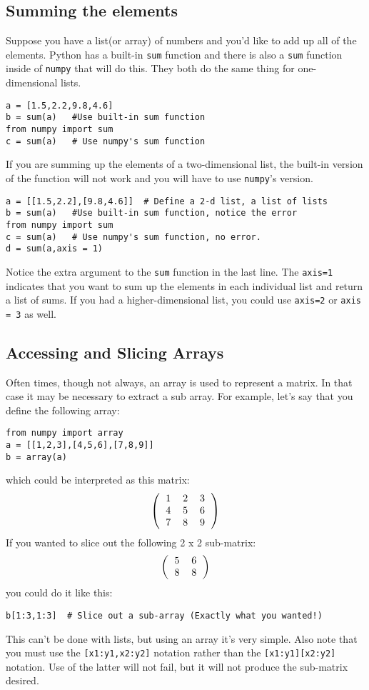 \subsection*{Summing the elements}
Suppose you have a list(or array) of numbers and you'd like to add up
all of the elements.  Python has a built-in \texttt{sum} function and
there is also a \texttt{sum} function inside of \texttt{numpy} that
will do this. They both do the same thing for one-dimensional lists.
\begin{Verbatim}
a = [1.5,2.2,9.8,4.6]
b = sum(a)   #Use built-in sum function
from numpy import sum
c = sum(a)   # Use numpy's sum function
\end{Verbatim}
If you are summing up the elements of a two-dimensional list, the
built-in version of the function will not work and you will have to
use \texttt{numpy}'s version.
\begin{Verbatim}
a = [[1.5,2.2],[9.8,4.6]]  # Define a 2-d list, a list of lists
b = sum(a)   #Use built-in sum function, notice the error
from numpy import sum
c = sum(a)   # Use numpy's sum function, no error.
d = sum(a,axis = 1) 
\end{Verbatim}
Notice the extra argument to the \texttt{sum} function in the last
line.  The \texttt{axis=1} indicates that you want to sum up the
elements in each individual list and return a list of sums.  If you
had a higher-dimensional list, you could use \texttt{axis=2} or
\texttt{axis = 3} as well.
\subsection*{Accessing and Slicing Arrays}
Often times, though not always, an array is used to represent a
matrix.  In that case it may be necessary to extract a sub array.  For
example, let's say that you define the following array:
\begin{Verbatim}
from numpy import array
a = [[1,2,3],[4,5,6],[7,8,9]]
b = array(a)
\end{Verbatim}
which could be interpreted as this matrix:
\begin{equation}
\left( \begin{tabular}{ccc}
1 & 2 & 3\\
4 & 5 & 6\\
7 & 8 & 9\\
\end{tabular}
\right)
\end{equation}
If you wanted to slice out the following 2 x 2 sub-matrix:
\begin{equation}
\left(\begin{tabular}{cc}
5 & 6 \\
8 & 8 \\
\end{tabular}
\right)
\end{equation}
you could do it like this:
\begin{Verbatim}
b[1:3,1:3]  # Slice out a sub-array (Exactly what you wanted!)
\end{Verbatim}
This can't be done with lists, but using an array it's very simple.
Also note that you must use the \texttt{[x1:y1,x2:y2]} notation rather
than the \texttt{[x1:y1][x2:y2]} notation.  Use of the latter will not
fail, but it will not produce the sub-matrix desired.
